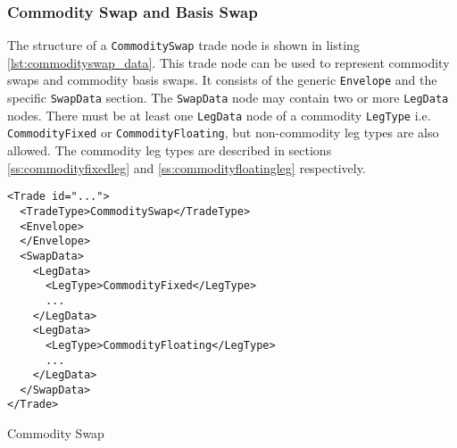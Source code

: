 \subsubsection{Commodity Swap and Basis Swap}
\label{ss:input_commodityswap}

The structure of a \lstinline!CommoditySwap! trade node is shown in listing \ref{lst:commodityswap_data}. This trade node can be used to represent commodity swaps and commodity basis swaps. It consists of the generic \lstinline!Envelope! and the specific \lstinline!SwapData! section. The \lstinline!SwapData! node may contain two or more \lstinline!LegData! nodes. There must be at least one \lstinline!LegData! node of a commodity  \lstinline!LegType! i.e. \lstinline!CommodityFixed! or \lstinline!CommodityFloating!, but non-commodity leg types are also allowed. The commodity leg types are described in sections \ref{ss:commodityfixedleg} and \ref{ss:commodityfloatingleg} respectively.

\begin{listing}[h!]
\begin{verbatim}
<Trade id="...">
  <TradeType>CommoditySwap</TradeType>
  <Envelope>
  </Envelope>
  <SwapData>
    <LegData>
      <LegType>CommodityFixed</LegType>
      ...
    </LegData>
    <LegData>
      <LegType>CommodityFloating</LegType>
      ...
    </LegData>
  </SwapData>
</Trade>
\end{verbatim}
\caption{Commodity Swap}
\label{lst:commodityswap_data}
\end{listing}

